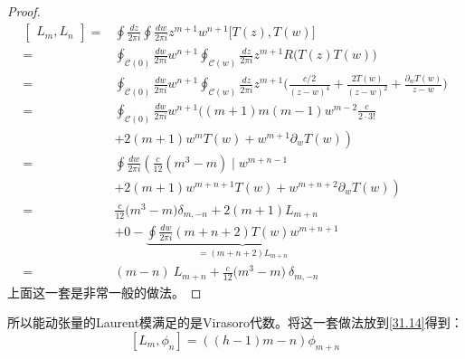 \begin{proof}
	\begin{equation}
		\begin{aligned}
			\begin{bmatrix}L_{m},L_{n}\end{bmatrix}=&\oint\frac{dz}{2\pi i}\oint\frac{dw}{2\pi i}z^{m+1}w^{n+1}\bigl[T(z),T(w)\bigr]  \\
			=&\oint_{\mathcal{C}(0)}\frac{dw}{2\pi i}w^{n+1}\oint_{\mathcal{C}(w)}\frac{dz}{2\pi i}z^{m+1}R\Big(T(z)T(w)\Big) \\
			=&\oint_{\mathcal{C}(0)}\frac{dw}{2\pi i}w^{n+1}\oint_{\mathcal{C}(w)}\frac{dz}{2\pi i}z^{m+1}\bigg(\frac{c/2}{(z-w)^4}+\frac{2T(w)}{(z-w)^2}+\frac{\partial_wT(w)}{z-w}\bigg) \\
			=&\oint_{\mathcal{C}(0)}\frac{dw}{2\pi i}w^{n+1}\Big((m+1)m(m-1)w^{m-2}\frac c{2\cdot3!} \\
			&+2\left(m+1\right)w^m\left.T(w)+w^{m+1}\partial_wT(w)\right) \\
			=&\oint\frac{dw}{2\pi i}\left(\frac c{12}(m^3-m)\mid w^{m+n-1}\right. \\
			&\left.+2(m+1)w^{m+n+1}T(w)+w^{m+n+2}\partial_{w}T(w)\right) \\
			=&\frac c{12}\bigl(m^3-m\bigr)\delta_{m,-n}+2(m+1)L_{m+n} \\
			&+0-\underbrace{\oint\frac{dw}{2\pi i}(m+n+2)T(w)w^{m+n+1}}_{=(m+n+2)L_{m+n}}\\
			=&(m-n)~L_{m+n}+\frac c{12}\Big(m^3-m\Big)~\delta_{m,-n}
		\end{aligned}
	\end{equation}
	上面这一套是非常一般的做法。
\end{proof}
所以能动张量的Laurent模满足的是Virasoro代数。将这一套做法放到\ref{31.14}得到：
\begin{equation}\label{31.27}
	\boxed{\left[L_m,\phi_n\right]=\left((h-1)m-n\right)\phi_{m+n}}
\end{equation}
